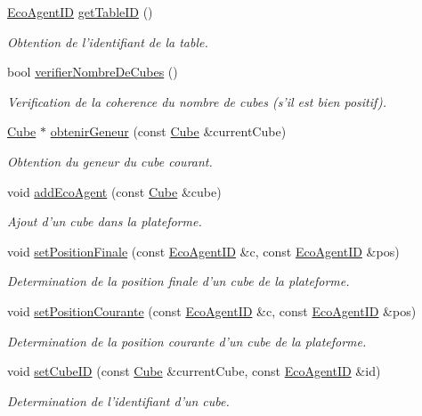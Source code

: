 \begin{CompactItemize}
\hyperlink{classEcoAgentID}{EcoAgentID} \hyperlink{classPlateformeMondeDesCubes_8919ce255ec5689a9dfce09667f0b461}{getTableID} ()
\begin{CompactList}\small\item\em Obtention de l'identifiant de la table. \item\end{CompactList}\item 
bool \hyperlink{classPlateformeMondeDesCubes_975dd26c6b3703a49498549392976d07}{verifierNombreDeCubes} ()
\begin{CompactList}\small\item\em Verification de la coherence du nombre de cubes (s'il est bien positif). \item\end{CompactList}\item 
\hyperlink{classCube}{Cube} $\ast$ \hyperlink{classPlateformeMondeDesCubes_23a34346419b046b04f771807a965765}{obtenirGeneur} (const \hyperlink{classCube}{Cube} \&currentCube)
\begin{CompactList}\small\item\em Obtention du geneur du cube courant. \item\end{CompactList}\item 
void \hyperlink{classPlateformeMondeDesCubes_0d16ae1a6181037c271456f0841cf63b}{addEcoAgent} (const \hyperlink{classCube}{Cube} \&cube)
\begin{CompactList}\small\item\em Ajout d'un cube dans la plateforme. \item\end{CompactList}\item 
void \hyperlink{classPlateformeMondeDesCubes_315f30b3c7c1e8bc9ec828a66a5813e5}{setPositionFinale} (const \hyperlink{classEcoAgentID}{EcoAgentID} \&c, const \hyperlink{classEcoAgentID}{EcoAgentID} \&pos)
\begin{CompactList}\small\item\em Determination de la position finale d'un cube de la plateforme. \item\end{CompactList}\item 
void \hyperlink{classPlateformeMondeDesCubes_ecc518787fb8231be37e7b8eb3c5390e}{setPositionCourante} (const \hyperlink{classEcoAgentID}{EcoAgentID} \&c, const \hyperlink{classEcoAgentID}{EcoAgentID} \&pos)
\begin{CompactList}\small\item\em Determination de la position courante d'un cube de la plateforme. \item\end{CompactList}\item 
void \hyperlink{classPlateformeMondeDesCubes_51b3dbb4c3e764231468f1ff19e35a06}{setCubeID} (const \hyperlink{classCube}{Cube} \&currentCube, const \hyperlink{classEcoAgentID}{EcoAgentID} \&id)
\begin{CompactList}\small\item\em Determination de l'identifiant d'un cube. \item\end{CompactList}\end{CompactItemize}
